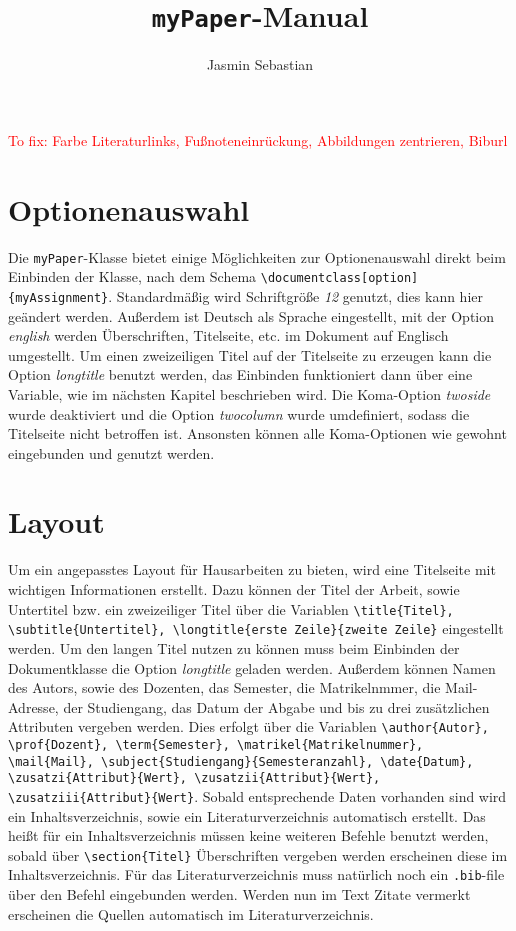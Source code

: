 \documentclass{myReport}
\title{\texttt{myPaper}-Manual}
\author{Jasmin Sebastian}
\begin{document}

\textcolor{red}{To fix: Farbe Literaturlinks, Fußnoteneinrückung, Abbildungen zentrieren, Biburl}

\section{Optionenauswahl}

Die \texttt{myPaper}-Klasse bietet einige Möglichkeiten zur Optionenauswahl direkt beim Einbinden der Klasse, nach dem Schema \lstinline|\documentclass[option]{myAssignment}|. Standardmäßig wird Schriftgröße \emph{12} genutzt, dies kann hier geändert werden. Außerdem ist Deutsch als Sprache eingestellt, mit der Option \emph{english} werden Überschriften, Titelseite, etc. im Dokument auf Englisch umgestellt. Um einen zweizeiligen Titel auf der Titelseite zu erzeugen kann die Option \emph{longtitle} benutzt werden, das Einbinden funktioniert dann über eine Variable, wie im nächsten Kapitel beschrieben wird. Die Koma-Option \emph{twoside} wurde deaktiviert und die Option \emph{twocolumn} wurde umdefiniert, sodass die Titelseite nicht betroffen ist. Ansonsten können alle Koma-Optionen wie gewohnt eingebunden und genutzt werden.


\section{Layout}

Um ein angepasstes Layout für Hausarbeiten zu bieten, wird eine Titelseite mit wichtigen Informationen erstellt. Dazu können der Titel der Arbeit, sowie Untertitel bzw. ein zweizeiliger Titel über die Variablen \lstinline|\title{Titel}, \subtitle{Untertitel}, \longtitle{erste Zeile}{zweite Zeile}| eingestellt werden. Um den langen Titel nutzen zu können muss beim Einbinden der Dokumentklasse die Option \emph{longtitle} geladen werden. Außerdem können Namen des Autors, sowie des Dozenten, das Semester, die Matrikelnmmer, die Mail-Adresse, der Studiengang, das Datum der Abgabe und bis zu drei zusätzlichen Attributen vergeben werden. Dies erfolgt über die Variablen \lstinline|\author{Autor}, \prof{Dozent}, \term{Semester}, \matrikel{Matrikelnummer}, \mail{Mail}, \subject{Studiengang}{Semesteranzahl}, \date{Datum}, \zusatzi{Attribut}{Wert}, \zusatzii{Attribut}{Wert}, \zusatziii{Attribut}{Wert}|. Sobald entsprechende Daten vorhanden sind wird ein Inhaltsverzeichnis, sowie ein Literaturverzeichnis automatisch erstellt. Das heißt für ein Inhaltsverzeichnis müssen keine weiteren Befehle benutzt werden, sobald über \lstinline|\section{Titel}| Überschriften vergeben werden erscheinen diese im Inhaltsverzeichnis. Für das Literaturverzeichnis muss natürlich noch ein \texttt{.bib}-file über den Befehl \lstinline|| eingebunden werden. Werden nun im Text Zitate vermerkt erscheinen die Quellen automatisch im Literaturverzeichnis.
\end{document}
